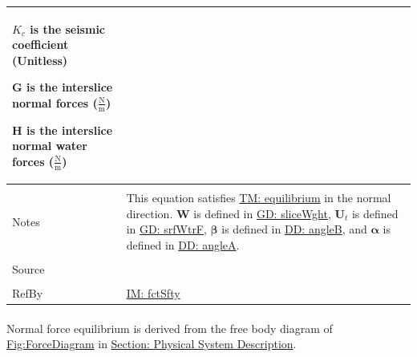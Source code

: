 \documentclass[12pt]{article}
\begin{document}
\begin{minipage}{\textwidth}
\begin{tabular}{>{\raggedright}p{}>{\raggedright\arraybackslash}p{}}
\begin{symbDescription}
              \item{${K_{c}}$ is the seismic coefficient (Unitless)}
              \item{$\mathbf{G}$ is the interslice normal forces ($\frac{\text{N}}{\text{m}}$)}
              \item{$\mathbf{H}$ is the interslice normal water forces ($\frac{\text{N}}{\text{m}}$)}
              \end{symbDescription}
\\ \midrule \\
Notes & This equation satisfies \hyperref[TM:equilibrium]{TM: equilibrium} in the normal direction. $\mathbf{W}$ is defined in \hyperref[GD:sliceWght]{GD: sliceWght}, ${\mathbf{U}_{t}}$ is defined in \hyperref[GD:srfWtrF]{GD: srfWtrF}, $\mathbf{β}$ is defined in \hyperref[DD:angleB]{DD: angleB}, and $\mathbf{α}$ is defined in \hyperref[DD:angleA]{DD: angleA}.
        
\\ \midrule \\
Source & \cite{chen2005}
         
\\ \midrule \\
RefBy & \hyperref[IM:fctSfty]{IM: fctSfty}
        
\\ \bottomrule
\end{tabular}
\end{minipage}
\paragraph{}
\label{GD:normForcEqDeriv}
Normal force equilibrium is derived from the free body diagram of \hyperref[Figure:ForceDiagram]{Fig:ForceDiagram} in \hyperref[Sec:PhysSyst]{Section: Physical System Description}.
\end{document}
